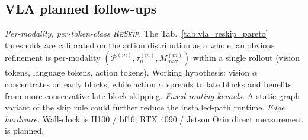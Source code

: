 \documentclass{article}
\newcommand{\reskip}{\textsc{ReSkip}}
\begin{document}
\subsection{VLA planned follow-ups}
\label{app:vla_future}
\emph{Per-modality, per-token-class \reskip{}.} The Tab.~\ref{tab:vla_reskip_pareto} thresholds are calibrated on the action distribution as a whole; an obvious refinement is per-modality $(\mathcal{P}^{(m)}, \tau_n^{(m)}, M_{\max}^{(m)})$ within a single rollout (vision tokens, language tokens, action tokens). Working hypothesis: vision $\alpha$ concentrates on early blocks, while action $\alpha$ spreads to late blocks and benefits from more conservative late-block skipping. \emph{Fused routing kernels.} A static-graph variant of the skip rule could further reduce the installed-path runtime. \emph{Edge hardware.} Wall-clock is H100 / bf16; RTX 4090 / Jetson Orin direct measurement is planned.
\end{document}

